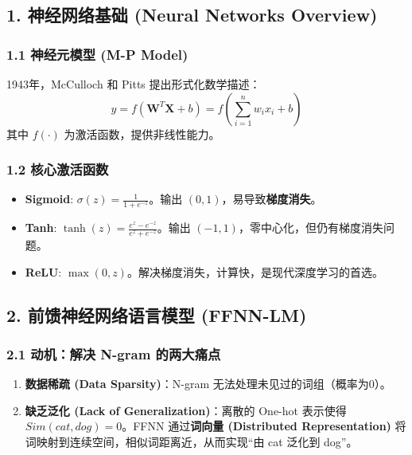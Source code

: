 \documentclass[a4paper, 11pt]{ctexart}
\begin{document}
\subsection{1. 神经网络基础 (Neural Networks Overview)}

\subsubsection{1.1 神经元模型 (M-P Model)}
1943年，McCulloch 和 Pitts 提出形式化数学描述：
\begin{equation}
    y = f(\mathbf{W}^T \mathbf{X} + b) = f\left( \sum_{i=1}^n w_i x_i + b \right)
\end{equation}
其中 $f(\cdot)$ 为激活函数，提供非线性能力。

\subsubsection{1.2 核心激活函数}
\begin{itemize}
    \item \textbf{Sigmoid}: $\sigma(z) = \frac{1}{1+e^{-z}}$。输出 $(0,1)$，易导致\textbf{梯度消失}。
    \item \textbf{Tanh}: $\tanh(z) = \frac{e^z - e^{-z}}{e^z + e^{-z}}$。输出 $(-1,1)$，零中心化，但仍有梯度消失问题。
    \item \textbf{ReLU}: $\max(0, z)$。解决梯度消失，计算快，是现代深度学习的首选。
\end{itemize}

\subsection{2. 前馈神经网络语言模型 (FFNN-LM)}

\subsubsection{2.1 动机：解决 N-gram 的两大痛点}
\begin{enumerate}
    \item \textbf{数据稀疏 (Data Sparsity)}：N-gram 无法处理未见过的词组（概率为0）。
    \item \textbf{缺乏泛化 (Lack of Generalization)}：离散的 One-hot 表示使得 $Sim(cat, dog) = 0$。FFNN 通过\textbf{词向量 (Distributed Representation)} 将词映射到连续空间，相似词距离近，从而实现“由 cat 泛化到 dog”。
\end{enumerate}
\end{document}
